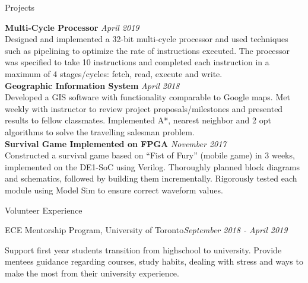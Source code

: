 \documentclass{resume} %
\begin{document}
\begin{rSection}{Projects}

{\bf Multi-Cycle Processor} \hfill {\em April 2019} 
\\Designed and implemented a 32-bit multi-cycle processor and used techniques such as pipelining to optimize the rate of instructions executed. The processor was specified to take 10 instructions and completed each instruction in a maximum of 4 stages/cycles: fetch, read, execute and write.\\

{\bf Geographic Information System} \hfill {\em April 2018} 
\\Developed a GIS software with functionality comparable to Google maps. Met weekly with instructor to review project proposals/milestones and presented results to fellow classmates. Implemented A*, nearest neighbor and 2 opt algorithms to solve the travelling salesman problem.\\

{\bf Survival Game Implemented on FPGA} \hfill {\em November 2017} 
\\Constructed a survival game based on “Fist of Fury” (mobile game) in 3 weeks, implemented on the DE1-SoC using Verilog. Thoroughly planned block diagrams and schematics, followed by building them incrementally. Rigorously tested each module using Model Sim to ensure correct waveform values.

\end{rSection}




\begin{rSection}{Volunteer Experience} 

\begin{rSubsection}{ECE Mentorship Program, University of Toronto}{\em September 2018 - April 2019}{}
\item Support first year students transition from highschool to university. Provide mentees guidance regarding courses, study habits, dealing with stress and ways to make the most from their university experience.

\end{rSubsection}

\end{rSection}
\end{document}
